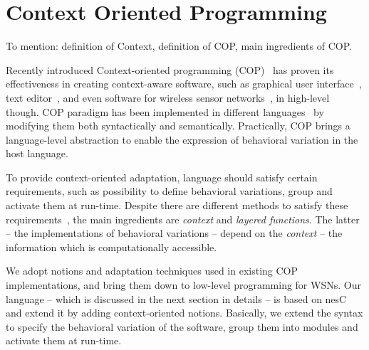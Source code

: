 \section{Context Oriented Programming}\label{sec:cop}
To mention: definition of Context, definition of COP, main ingredients of COP.

Recently introduced Context-oriented programming (COP)~\cite{Hirschfeld08} has
proven its effectiveness in creating context-aware software, such as graphical
user interface~\cite{Keays03}, text editor~\cite{Kamina11}, and even software for wireless
sensor networks~\cite{Sehic11}, in high-level though. COP paradigm has been
implemented in different languages~\cite{Salvaneschi12} by modifying them both
syntactically and semantically. Practically, COP brings a language-level abstraction 
to enable the expression of behavioral variation in the host language.

To provide context-oriented adaptation, language should satisfy certain requirements, such as
possibility to define behavioral variations, group and activate them at
run-time. Despite there are different methods to satisfy these
requirements~\cite{Salvaneschi12}, the main ingredients are \emph{context} and
\emph{layered functions}. The latter -- the implementations of behavioral
variations -- depend on the \emph{context} -- the information which is
computationally accessible.

We adopt notions and adaptation techniques used in existing COP implementations,
and bring them down to low-level programming for WSNs. Our language \conesc --
which is discussed in the next section in details -- is based on nesC and extend
it by adding context-oriented notions. Basically, we extend the syntax to
specify the behavioral variation of the software, group them into modules and
activate them at run-time.
